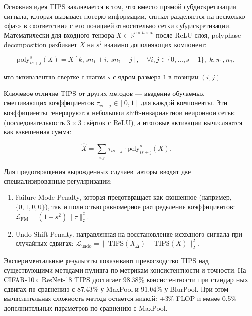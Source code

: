 Основная идея TIPS заключается в том, что вместо прямой субдискретизации сигнала, которая вызывает потерю информации, сигнал разделяется на несколько «фаз» в соответствии с его позицией относительно сетки субдискретизации. Математически для входного тензора $X\in\mathbb{R}^{c\times h\times w}$ после ReLU-слоя, polyphase decomposition разбивает $X$ на $s^2$ взаимно дополняющих компонент:

\begin{equation}
  \text{poly}_{is+j}^{s}(X) = X[k,\,sn_1+i,\,sn_2+j], \quad \forall i,j\in\{0,\dots,s-1\},\;k,n_1,n_2,
\end{equation}

что эквивалентно свертке с шагом $s$ с ядром размера $1$ в позиции $(i,j)$.

Ключевое отличие TIPS от других методов — введение обучаемых смешивающих коэффициентов $\tau_{is+j}\in[0,1]$ для каждой компоненты. Эти коэффициенты генерируются небольшой shift-инвариантной нейронной сетью (последовательность $3\times3$ свёрток с ReLU), а итоговые активации вычисляются как взвешенная сумма:

\begin{equation}
  \hat{X} = \sum_{i,j} \tau_{is+j} \cdot \text{poly}_{is+j}^{s}(X).
\end{equation}

Для предотвращения вырожденных случаев, авторы вводят две специализированные регуляризации:

\begin{enumerate}
    \item Failure-Mode Penalty, которая предотвращает как скошенное (например, $\{0,1,0,0\}$), так и полностью равномерное распределение коэффициентов: $\mathcal{L}_{\text{FM}} = (1-s^2)\|\tau\|_2^2$.
    
    \item Undo-Shift Penalty, направленная на восстановление исходного сигнала при случайных сдвигах: $\mathcal{L}_{\text{undo}} = \|\text{TIPS}(X_{\Delta})-\text{TIPS}(X)\|_2^2$.
\end{enumerate}

Экспериментальные результаты показывают превосходство TIPS над существующими методами пулинга по метрикам консистентности и точности. На CIFAR-10 с ResNet-18 TIPS достигает 98.38\% консистентности при стандартных сдвигах по сравнению с 87.43\% у MaxPool и 91.04\% у BlurPool. При этом вычислительная сложность метода остается низкой: +3\% FLOP и менее 0.5\% дополнительных параметров по сравнению с MaxPool.

